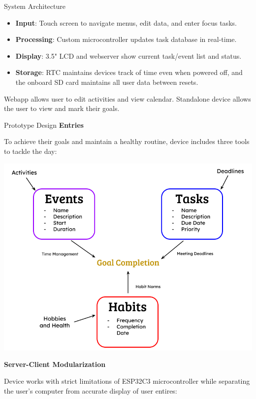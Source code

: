 \documentclass[final]{beamer}
\newlength{\colwidth}
\begin{document}
\begin{frame}[t]
\begin{columns}[t]
\begin{column}{\colwidth}
\begin{block}{System Architecture}
        \begin{itemize}
          \item \textbf{Input}: Touch screen to navigate menus, edit data, and enter focus tasks.
          \item \textbf{Processing}: Custom microcontroller updates task database in real-time.
          \item \textbf{Display}: 3.5" LCD and webserver show current task/event list and status.
          \item \textbf{Storage}: RTC maintains devices track of time even when powered off, and the onboard SD card maintains all user data between resets.
        \end{itemize}

        Webapp allows user to edit activities and view calendar. Standalone device allows the user to view and mark their goals.

      \end{block}

      \begin{block}{Prototype Design}
        \textbf{Entries}

        To achieve their goals and maintain a healthy routine, device includes three tools to tackle the day:

        \begin{center}
          \includegraphics[width = 0.9 \textwidth]{entry_logic.png}
        \end{center}

        \textbf{Server-Client Modularization}

        Device works with strict limitations of ESP32C3 microcontroller while separating the user's computer from accurate display of user entires:


\end{block}
\end{column}
\end{columns}
\end{frame}
\end{document}
